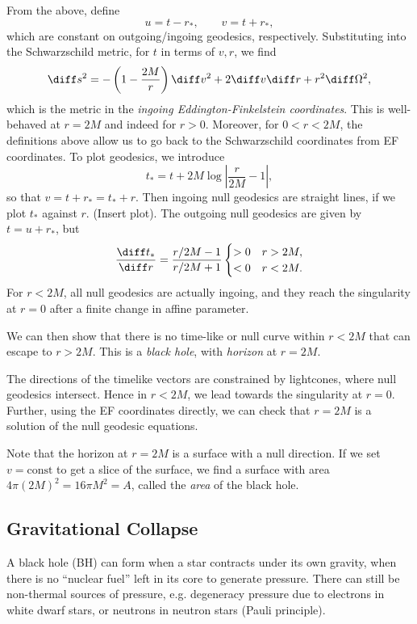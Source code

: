 \documentclass[12pt]{article}
\begin{document}
From the above, define
\[
u = t - r_\ast, \qquad v = t + r_\ast,
\]
which are constant on outgoing/ingoing geodesics, respectively. Substituting into the Schwarzschild metric, for $t$ in terms of $v, r$, we find
\[
\diff s^2 = - \left(1 - \frac{2M}{r} \right) \diff v^2 + 2 \diff v\diff r + r^2 \diff \Omega^2,
\]
which is the metric in the \emph{ingoing Eddington-Finkelstein coordinates}. This is well-behaved at $r = 2M$ and indeed for $r > 0$. Moreover, for $0 < r < 2M$, the definitions above allow us to go back to the Schwarzschild coordinates from EF coordinates. To plot geodesics, we introduce
\[
t_\ast = t + 2M \log \left| \frac{r}{2M} - 1 \right|,
\]
so that $v = t + r_\ast = t_\ast + r$. Then ingoing null geodesics are straight lines, if we plot $t_\ast$ against $r$. (Insert plot). The outgoing null geodesics are given by $t = u + r_\ast$, but
\[
\frac{\diff t_\ast}{\diff r} = \frac{r/2M - 1}{r/2M + 1}
\begin{cases}
	> 0 & r > 2M, \\
	< 0 & r < 2M.
\end{cases}
\]
For $r < 2M$, all null geodesics are actually ingoing, and they reach the singularity at $r = 0$ after a finite change in affine parameter.

We can then show that there is no time-like or null curve within $r < 2M$ that can escape to $r > 2M$. This is a \emph{black hole}, with \emph{horizon} at $r = 2M$.

The directions of the timelike vectors are constrained by lightcones, where null geodesics intersect. Hence in $r < 2M$, we lead towards the singularity at $r = 0$. Further, using the EF coordinates directly, we can check that $r = 2M$ is a solution of the null geodesic equations.

Note that the horizon at $r = 2M$ is a surface with a null direction. If we set $v = \mathrm{const}$ to get a slice of the surface, we find a surface with area $4 \pi (2M)^2 = 16 \pi M^2 = A$, called the \emph{area} of the black hole.

\subsection{Gravitational Collapse}
\label{sub:gc}

A black hole (BH) can form when a star contracts under its own gravity, when there is no ``nuclear fuel'' left in its core to generate pressure. There can still be non-thermal sources of pressure, e.g. degeneracy pressure due to electrons in white dwarf stars, or neutrons in neutron stars (Pauli principle).
\end{document}
